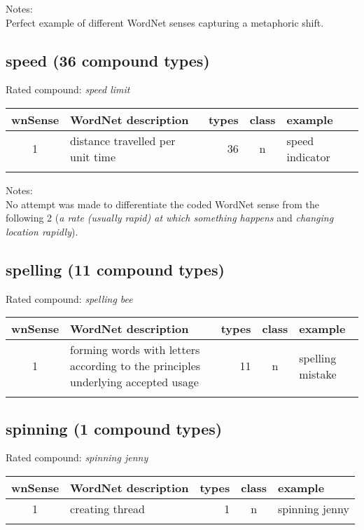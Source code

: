 \noindent
Notes:\\
Perfect example of different WordNet senses capturing a metaphoric shift.
\subsection{speed (36 compound types)}
Rated compound: \emph{speed limit}


\noindent
\begin{longtable}{c>{\raggedright\arraybackslash}p{5cm}rc>{\raggedright\arraybackslash}p{2cm}}\lsptoprule
{\small wnSense}&WordNet description&types&class&example\\\midrule
1&distance travelled per unit time&36&n&speed indicator\\\lspbottomrule
\end{longtable}

\noindent
Notes:\\
No attempt was made to differentiate the coded WordNet sense from the 
following 2 (\emph{a rate (usually rapid) at which something
  happens} and \emph{changing location rapidly}).

\subsection{spelling     (11 compound types)}
Rated compound: \emph{spelling bee}

\vspace*{1ex}

\noindent
\begin{longtable}{c>{\raggedright\arraybackslash}p{5cm}rc>{\raggedright\arraybackslash}p{2cm}}\lsptoprule
{\small wnSense}&WordNet description&types&class&example\\\midrule
1&forming words with letters according to the principles underlying
accepted usage&11&n&spelling mistake\\\lspbottomrule
\end{longtable}
\subsection{spinning     (1 compound types)}
Rated compound: \emph{spinning jenny}

\vspace*{1ex}

\noindent
\begin{longtable}{c>{\raggedright\arraybackslash}p{5cm}rc>{\raggedright\arraybackslash}p{2cm}}\lsptoprule
{\small wnSense}&WordNet description&types&class&example\\\midrule
1&creating thread&1&n&spinning jenny\\\lspbottomrule
\end{longtable}

